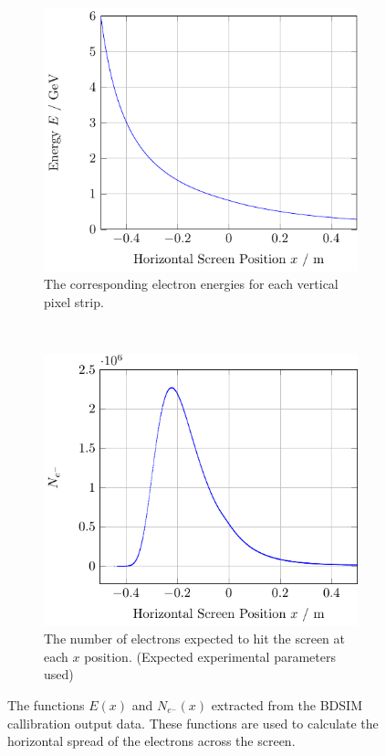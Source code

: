 \begin{figure}[!tb]
	\centering
	\begin{subfigure}[t]{0.49\textwidth}
		\includegraphics{./figures/eofx.pdf}
		\caption{
			The corresponding electron energies for each vertical pixel strip.
		}
		\label{fig:eofx}
	\end{subfigure}\hfill~
	\begin{subfigure}[t]{0.49\textwidth}
		\includegraphics{./figures/edist.pdf}
		\caption{
			The number of electrons expected to hit the screen at each \(x\)
			position. (Expected experimental parameters used)
		}
		\label{fig:edist}
	\end{subfigure}
	\caption{
		The functions \(E(x)\) and \(N_{e^-}(x)\) extracted from the BDSIM
		callibration output data. These functions are used to calculate the
		horizontal spread of the electrons across the screen.
	}
\end{figure}

